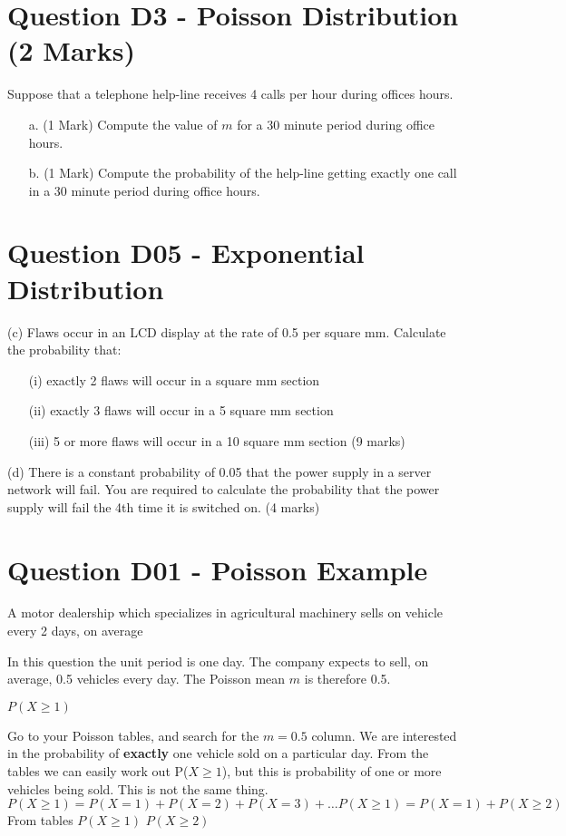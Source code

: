 \documentclass[]{report}
\begin{document}
	
\section{Question D3 -  Poisson Distribution (2 Marks) }  %
Suppose that a telephone help-line receives 4 calls per hour during offices hours.
\begin{itemize}
	\item[a.] (1 Mark) Compute the value of $m$ for a 30 minute period during office hours.
	\item[b.] (1 Mark) Compute the probability of the help-line getting exactly one call in a 30 minute period during office hours.
\end{itemize}




\section{Question D05 - Exponential Distribution } %
(c)	Flaws occur in an LCD display at the rate of 0.5 per square mm.  Calculate the probability that:
\begin{itemize}
	\item[(i)]	exactly 2 flaws will occur in a square mm section
	\item[(ii)]	exactly 3 flaws will occur in a 5 square mm section
	\item[(iii)]	5 or more flaws will occur in a 10 square mm section
	(9 marks)
\end{itemize}

(d)	There is a constant probability of 0.05 that the power supply in a server network will fail.  You are required to calculate the probability that the power supply will fail the 4th time it is switched on.
(4 marks)



\section{Question D01  - Poisson Example}
A motor dealership which specializes in agricultural machinery sells on vehicle every 2 days, on average

In this question the unit period is one day. The company expects to sell, on average, 0.5 vehicles every day.
The Poisson mean $m$ is therefore 0.5.

$P(X \geq 1)$

Go to your Poisson tables, and search for the $m=0.5$ column.
We are interested in the probability of \textbf{exactly} one vehicle sold on a particular day.
From the tables we can easily work out P($X \geq 1$), but this is probability of one or more vehicles being sold.
This is not the same thing.
\[P(X \geq 1) = P(X =1) + P( X=2) + P(X=3) + \ldots
P(X \geq 1) = P(X=1) + P(X \geq 2)\]
From tables
$P(X \geq 1)$
$P(X \geq 2)$
\end{document}
